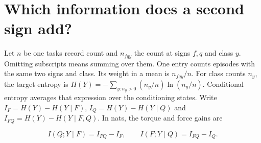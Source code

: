 \clearpage

\section{Which information does a second sign add?}\label{which-information-does-a-second-sign-add}

Let \(n\) be one task\textquotesingle s record count and \(n_{fqy}\) the count at signs \(f,q\) and class \(y\). Omitting subscripts means summing over them. One entry counts episodes with the same two signs and class. Its weight in a mean is \(n_{fqy}/n\). For class counts \(n_y\), the target entropy is \(H(Y)=-\sum_{y:n_y>0}(n_y/n)\ln(n_y/n)\). Conditional entropy averages that expression over the conditioning states. Write \(I_F=H(Y)-H(Y\mid F)\), \(I_Q=H(Y)-H(Y\mid Q)\) and \(I_{FQ}=H(Y)-H(Y\mid F,Q)\). In nats, the torque and force gains are

\[
I(Q;Y\mid F)=I_{FQ}-I_F,\qquad I(F;Y\mid Q)=I_{FQ}-I_Q.
\]

